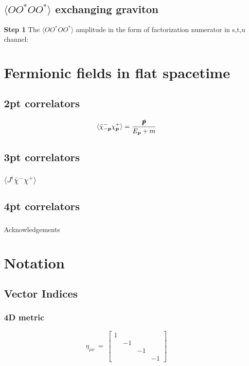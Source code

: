 \documentclass[11pt,a4paper]{article}
\newcommand{\ie}{\begin{equation}\begin{aligned}}
\newcommand{\fe}{\end{aligned}\end{equation}}
\begin{document}
\subsection{$\langle OO^*OO^* \rangle$ exchanging graviton}
\textbf{Step 1}  The $\langle OO^*OO^* \rangle$ amplitude in the form of factorization numerator in s,t,u channel:


\section{Fermionic fields in flat spacetime}

\subsection{2pt correlators}
\ie
\langle \bar{\chi }_{-\boldsymbol{p}}^{-} \chi _{\boldsymbol{p}}^{+} \rangle = \frac{\slashed{\boldsymbol{p}}}{E_{\boldsymbol{p}}+m}
\fe


\subsection{3pt correlators}
\subsubsection{$\langle J^i \bar{\chi }^{-} \chi^{+} \rangle$}

\subsection{4pt correlators}
\subsubsection{}



\acknowledgments
Acknowledgements






\appendix

\section{Notation}
\subsection{Vector Indices}
\subsubsection{4D metric}
\[\eta _{\mu \nu } \ =\ \begin{bmatrix}
1 &  &  & \\
 & -1 &  & \\
 &  & -1 & \\
 &  &  & -1
\end{bmatrix}\]
\end{document}
